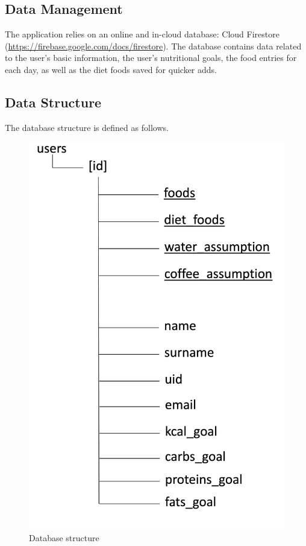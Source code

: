 \documentclass{Configuration_Files/PoliMi3i_thesis}
\begin{document}
\subsection{Data Management}
The application relies on an online and in-cloud database: Cloud Firestore (\url{https://firebase.google.com/docs/firestore}). 
The database contains data related to the user's basic information, the user's nutritional goals, the food entries for each day, as well as the diet foods saved for quicker adds. 
\subsection{Data Structure}
The database structure is defined as follows.
\begin{figure}[H]
  \centering
  \includegraphics[scale=0.25]{Images/db_structure.png}
  \caption{Database structure}
\end{figure}
\end{document}
